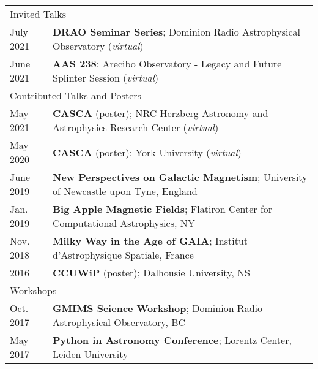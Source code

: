 \documentclass[10pt]{res} %
\begin{document}
\begin{resume}
\begin{table}[h!]
\begin{tabularx}{\textwidth}{lX}
\multicolumn{2}{l}{ \rule{0pt}{3ex} \large \hspace{-12pt} Invited Talks \dotfill \rule[-1.2ex]{0pt}{0pt}} \\
July 2021 & \textbf{DRAO Seminar Series}; Dominion Radio Astrophysical Observatory (\textit{virtual}) \\
June 2021 & \textbf{AAS 238}; Arecibo Observatory - Legacy and Future Splinter Session (\textit{virtual}) \\
\multicolumn{2}{l}{ \rule{0pt}{3ex} \large \hspace{-12pt} Contributed Talks and Posters \dotfill \rule[-1.2ex]{0pt}{0pt}} \\
May 2021 & \textbf{CASCA} (poster); NRC Herzberg Astronomy and Astrophysics Research Center (\textit{virtual}) \\
May 2020 & \textbf{CASCA} (poster); York University (\textit{virtual}) \\
June 2019 & \textbf{New Perspectives on Galactic Magnetism}; University of Newcastle upon Tyne, England \\
Jan. 2019 & \textbf{Big Apple Magnetic Fields}; Flatiron Center for Computational Astrophysics, NY \\
Nov. 2018 & \textbf{Milky Way in the Age of GAIA}; Institut d'Astrophysique Spatiale, France \\
2016 & \textbf{CCUWiP} (poster); Dalhousie University, NS \\
\multicolumn{2}{l}{ \rule{0pt}{3ex} \large \hspace{-12pt} Workshops \dotfill \rule[-1.2ex]{0pt}{0pt}}  \\
Oct. 2017 & \textbf{GMIMS Science Workshop}; Dominion Radio Astrophysical Observatory, BC \\
May 2017 & \textbf{Python in Astronomy Conference}; Lorentz Center, Leiden University 
\end{tabularx}
\end{table}



\end{resume}
\end{document}
